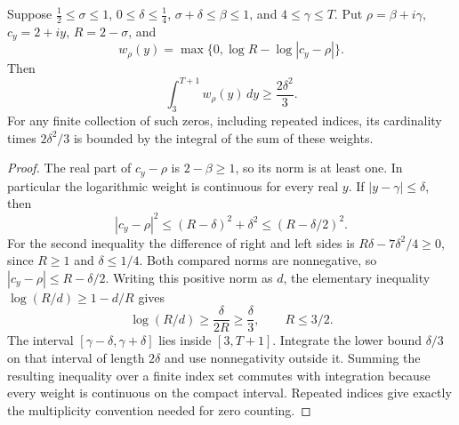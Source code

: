 \begin{lemma}
\label{density:jensen-mass}
\leanok
Suppose $\tfrac12\leq\sigma\leq1$, $0\leq\delta\leq\tfrac14$,
$\sigma+\delta\leq\beta\leq1$, and $4\leq\gamma\leq T$.
Put $\rho=\beta+i\gamma$, $c_y=2+iy$, $R=2-\sigma$, and
\[
 w_\rho(y)=\max\{0,\log R-\log|c_y-\rho|\}.
\]
Then
\[
 \int_3^{T+1}w_\rho(y)\,dy\geq\frac{2\delta^2}{3}.
\]
For any finite collection of such zeros, including repeated indices,
its cardinality times $2\delta^2/3$ is bounded by the integral of
the sum of these weights.
\end{lemma}
\begin{proof}
The real part of $c_y-\rho$ is $2-\beta\geq1$, so its norm is
at least one.  In particular the logarithmic weight is continuous
for every real $y$.
If $|y-\gamma|\leq\delta$, then
\[
 |c_y-\rho|^2\leq(R-\delta)^2+\delta^2
                   \leq(R-\delta/2)^2.
\]
For the second inequality the difference of right and left sides is
$R\delta-7\delta^2/4\geq0$, since $R\geq1$ and
$\delta\leq1/4$.  Both compared norms are nonnegative, so
$|c_y-\rho|\leq R-\delta/2$.
Writing this positive norm as $d$, the elementary inequality
$\log(R/d)\geq1-d/R$ gives
\[
 \log(R/d)\geq\frac\delta{2R}\geq\frac\delta3,
 \qquad R\leq3/2.
\]
The interval $[\gamma-\delta,\gamma+\delta]$ lies inside $[3,T+1]$.
Integrate the lower bound $\delta/3$ on that interval of length
$2\delta$ and use nonnegativity outside it.  Summing the resulting
inequality over a finite index set commutes with integration because
every weight is continuous on the compact interval.  Repeated indices
give exactly the multiplicity convention needed for zero counting.
\end{proof}


